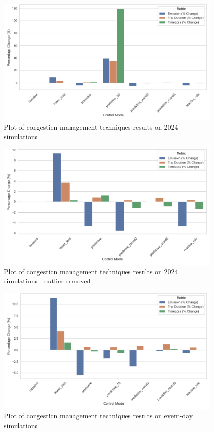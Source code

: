\begin{figure}[!ht]
  \centering
  \includegraphics[width=\textwidth]{images/results-discussions/2024-sims-full.pdf}
  \caption{Plot of congestion management techniques results on 2024 simulations}
  \label{fig:2024-sims-full}
\end{figure}

\begin{figure}[!ht]
  \centering
  \includegraphics[width=\textwidth]{images/results-discussions/2024-sims-reduced.pdf}
  \caption{Plot of congestion management techniques results on 2024 simulations - outlier removed}
  \label{fig:2024-sims-reduced}
\end{figure}

\begin{figure}[!ht]
  \centering
  \includegraphics[width=\textwidth]{images/results-discussions/event-sims-full.pdf}
  \caption{Plot of congestion management techniques results on event-day simulations}
  \label{fig:event-sims-full}
\end{figure}

